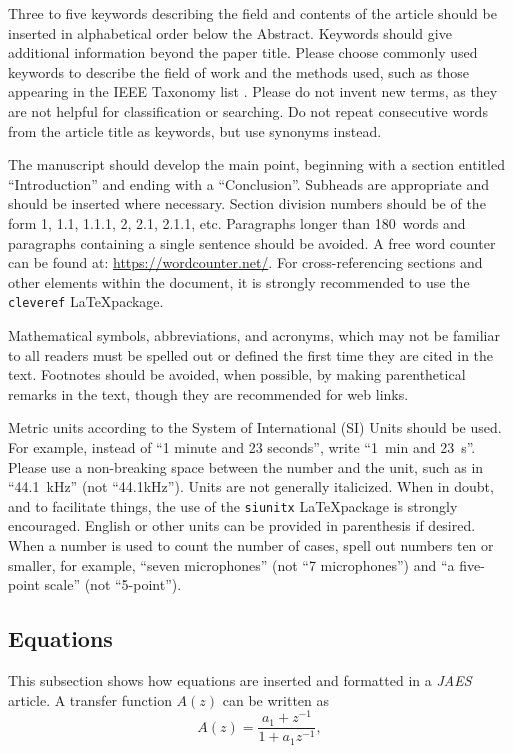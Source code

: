 \documentclass[fleqn]{jaes}
\begin{document}
Three to five keywords describing the field and contents of the article should be inserted in alphabetical order below the Abstract. Keywords should give additional information beyond the paper title. Please choose commonly used keywords to describe the field of work and the methods used, such as those appearing in the IEEE Taxonomy list \cite{ieee-taxonomy}. Please do not invent new terms, as they are not helpful for classification or searching. Do not repeat consecutive words from the article title as keywords, but use synonyms instead. 

The manuscript should develop the main point, beginning with a section entitled ``Introduction'' and ending with a ``Conclusion''. Subheads are appropriate and should be inserted where necessary. Section division numbers should be of the form 1, 1.1, 1.1.1, 2, 2.1, 2.1.1, etc. Paragraphs longer than 180~words and paragraphs containing a single sentence should be avoided. A free word counter can be found at: \url{https://wordcounter.net/}. For cross-referencing sections and other elements within the document, it is strongly recommended to use the \texttt{cleveref} \LaTeX package.

Mathematical symbols, abbreviations, and acronyms, which may not be familiar to all readers must be spelled out or defined the first time they are cited in the text. Footnotes should be avoided, when possible, by making parenthetical remarks in the text, though they are recommended for web links. 

Metric units according to the System of International (SI) Units should be used. For example, instead of ``1 minute and 23 seconds'', write ``\SI{1}{\minute} and \SI{23}{\second}''. Please use a non-breaking space between the number and the unit, such as in ``44.1~kHz'' (not ``44.1kHz''). Units are not generally italicized. When in doubt, and to facilitate things, the use of the \texttt{siunitx} \LaTeX package is strongly encouraged. English or other units can be provided in parenthesis if desired. When a number is used to count the number of cases, spell out numbers ten or smaller, for example, “seven microphones” (not “7 microphones”) and “a five-point scale” (not “5-point”). 

\subsection{Equations}
This subsection shows how equations are inserted and formatted in a \emph{JAES} article. A transfer function $A(z)$ can be written as
\begin{equation}
A(z) = \frac{{a_1  + z^{ - 1} }}{{1 + a_1 z^{ - 1} }},
\label{eq:transfer_function}
\end{equation}
\end{document}
